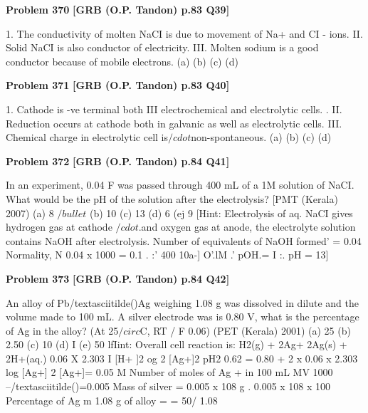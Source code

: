 \begin{problembox}
\textbf{Problem 370} \hfill \textbf{[GRB (O.P. Tandon) p.83 Q39]}
\label{q:ext-grb_all_questions-370}

1. The conductivity of molten NaCI is due to movement of 
Na+ and CI - ions. 
II. Solid NaCI is also conductor of electricity. 
III. Molten sodium is a good conductor because of mobile 
electrons. 
(a) 
(b) 
(c) 
(d)
\end{problembox}

\begin{problembox}
\textbf{Problem 371} \hfill \textbf{[GRB (O.P. Tandon) p.83 Q40]}
\label{q:ext-grb_all_questions-371}

1. Cathode is -ve terminal both III electrochemical and 
electrolytic cells. 
. 
II. Reduction occurs at cathode both in galvanic as well as 
electrolytic cells. 
III. Chemical charge in electrolytic cell is$/cdot$non-spontaneous. 
(a) 
(b) 
(c) 
(d)
\end{problembox}

\begin{problembox}
\textbf{Problem 372} \hfill \textbf{[GRB (O.P. Tandon) p.84 Q41]}
\label{q:ext-grb_all_questions-372}

In an experiment, 0.04 F was passed through 400 mL of a 1M 
solution of NaCI. What would be the pH of the solution after 
the electrolysis? 
[PMT (Kerala) 2007) 
(a) 8 
$/bullet$ (b) 10 
(c) 13 
(d) 6 
(ej 9 
[Hint: 
Electrolysis of aq. NaCI gives hydrogen gas at 
cathode $/cdot$.and oxygen gas at anode, the electrolyte solution 
contains NaOH after electrolysis. 
Number of equivalents of NaOH formed' = 0.04 
Normality, 
N 
0.04 x 1000 = 0.1 
. :' 400 
10a-] O'.lM 
.' pOH.= I 
:. pH = 13]
\end{problembox}

\begin{problembox}
\textbf{Problem 373} \hfill \textbf{[GRB (O.P. Tandon) p.84 Q42]}
\label{q:ext-grb_all_questions-373}

An alloy of Pb/textasciitilde()Ag weighing 1.08 g was dissolved in dilute 
and the volume made to 100 mL. A silver electrode was 
is 0.80 V, what is the percentage of Ag in the alloy? 
(At 25$/circ$C, RT / F 
0.06) 
(PET (Kerala) 2001) 
(a) 25 
(b) 2.50 
(c) 10 
(d) I 
(e) 50 
lfIint: Overall cell reaction is: 
H2(g) + 2Ag+ 
2Ag(s) + 2H+(aq.) 
0.06 X 2.303 I 
[H+ ]2 
og 
2 
[Ag+]2 pH2 
0.62 = 0.80 + 2 x 0.06 x 2.303 log [Ag+] 
2 
[Ag+]= 0.05 M 
Number of moles of Ag + in 100 mL 
MV 
1000 
--/textasciitilde()=0.005 
Mass of silver = 0.005 x 108 g 
. 
0.005 x 108 x 100 
Percentage of Ag m 1.08 g of alloy = 
= 50/%
1.08
\end{problembox}

